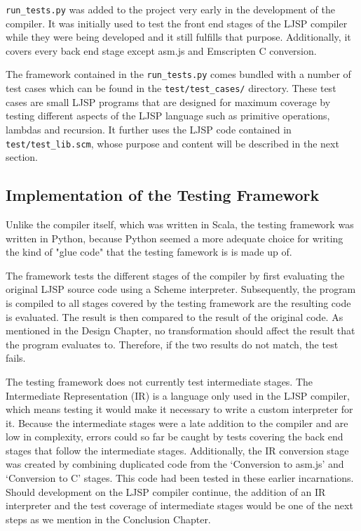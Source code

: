 \documentclass[11pt]{report}
\begin{document}
\texttt{run_tests.py} was added to the project very early in the development of the compiler. It was initially used to test the front end stages of the LJSP compiler while they were being developed and it still fulfills that purpose. Additionally, it covers every back end stage except asm.js and Emscripten C conversion.

The framework contained in the \texttt{run_tests.py} comes bundled with a number of test cases which can be found in the \texttt{test/test_cases/} directory. These test cases are small LJSP programs that are designed for maximum coverage by testing different aspects of the LJSP language such as primitive operations, lambdas and recursion. It further uses the LJSP code contained in \texttt{test/test_lib.scm}, whose purpose and content will be described in the next section.

\subsection{Implementation of the Testing Framework}
Unlike the compiler itself, which was written in Scala, the testing framework was written in Python, because Python seemed a more adequate choice for writing the kind of "glue code" that the testing famework is is made up of. 

The framework tests the different stages of the compiler by first evaluating the original LJSP source code using a Scheme interpreter. Subsequently, the program is compiled to all stages covered by the testing framework are the resulting code is evaluated. The result is then compared to the result of the original code. As mentioned in the Design Chapter, no transformation should affect the result that the program evaluates to. Therefore, if the two results do not match, the test fails.

The testing framework does not currently test intermediate stages. The Intermediate Representation (IR) is a language only used in the LJSP compiler, which means testing it would make it necessary to write a custom interpreter for it. Because the intermediate stages were a late addition to the compiler and are low in complexity, errors could so far be caught by tests covering the back end stages that follow the intermediate stages. Additionally, the IR conversion stage was created by combining duplicated code from the `Conversion to asm.js' and `Conversion to C' stages. This code had been tested in these earlier incarnations. Should development on the LJSP compiler continue, the addition of an IR interpreter and the test coverage of intermediate stages would be one of the next steps as we mention in the Conclusion Chapter.
\end{document}
